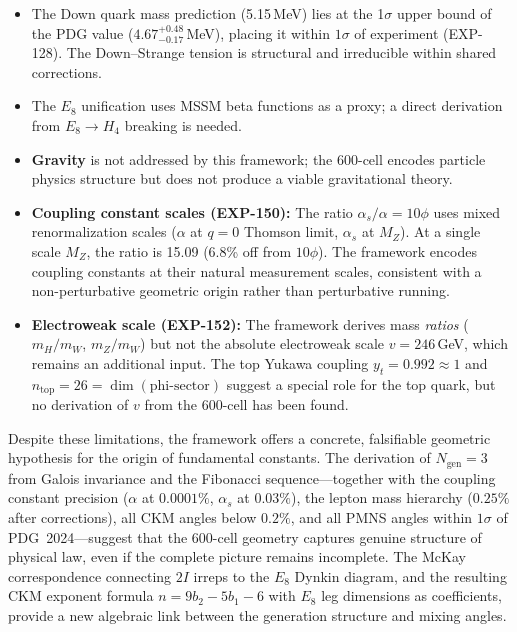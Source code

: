 \documentclass[12pt,a4paper]{article}
\begin{document}
\begin{itemize}
    \item The Down quark mass prediction (5.15\,MeV) lies at the 1$\sigma$ upper bound of the PDG value ($4.67^{+0.48}_{-0.17}$\,MeV), placing it within $1\sigma$ of experiment (EXP-128). The Down--Strange tension is structural and irreducible within shared corrections.
    \item The $E_8$ unification uses MSSM beta functions as a proxy; a direct derivation from $E_8 \to H_4$ breaking is needed.
    \item \textbf{Gravity} is not addressed by this framework; the 600-cell encodes particle physics structure but does not produce a viable gravitational theory.
    \item \textbf{Coupling constant scales (EXP-150):} The ratio $\alpha_s/\alpha = 10\phi$ uses mixed renormalization scales ($\alpha$ at $q = 0$ Thomson limit, $\alpha_s$ at $M_Z$). At a single scale $M_Z$, the ratio is 15.09 (6.8\% off from $10\phi$). The framework encodes coupling constants at their natural measurement scales, consistent with a non-perturbative geometric origin rather than perturbative running.
    \item \textbf{Electroweak scale (EXP-152):} The framework derives mass \emph{ratios} ($m_H/m_W$, $m_Z/m_W$) but not the absolute electroweak scale $v = 246\,$GeV, which remains an additional input. The top Yukawa coupling $y_t = 0.992 \approx 1$ and $n_{\text{top}} = 26 = \dim(\text{phi-sector})$ suggest a special role for the top quark, but no derivation of $v$ from the 600-cell has been found.
\end{itemize}

Despite these limitations, the framework offers a concrete, falsifiable geometric hypothesis for the origin of fundamental constants. The derivation of $N_{\text{gen}} = 3$ from Galois invariance and the Fibonacci sequence---together with the coupling constant precision ($\alpha$ at $0.0001\%$, $\alpha_s$ at $0.03\%$), the lepton mass hierarchy ($0.25\%$ after corrections), all CKM angles below $0.2\%$, and all PMNS angles within $1\sigma$ of PDG~2024---suggest that the 600-cell geometry captures genuine structure of physical law, even if the complete picture remains incomplete. The McKay correspondence connecting $2I$ irreps to the $E_8$ Dynkin diagram, and the resulting CKM exponent formula $n = 9b_2 - 5b_1 - 6$ with $E_8$ leg dimensions as coefficients, provide a new algebraic link between the generation structure and mixing angles.

\end{document}
